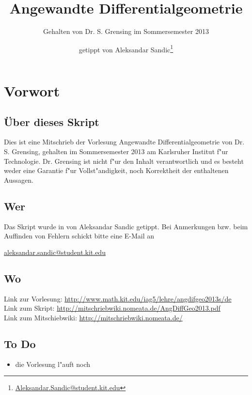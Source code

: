 \documentclass[paper=A4, twoside, chapterprefix=true, bibliography=totoc, headsepline]{scrbook}
\title{Angewandte Differentialgeometrie}
\subtitle{Gehalten von Dr. S. Grensing im Sommersemester 2013}
\author{getippt von Aleksandar Sandic\thanks{\href{mailto:aleksandar.sandic@student.kit.edu}{Aleksandar.Sandic@student.kit.edu}}}
\theoremstyle{break}
\theoremstyle{nonumberbreak}
\theoremstyle{emptybreak}
\theoremstyle{break}
\newcommand{\quot}[1]{\textrm{\glqq}{#1}\textrm{\grqq}}
\begin{document}
\maketitle

\setlength\parskip{0.6pt}
\tableofcontents

\chapter*{Vorwort}

\section*{\"Uber dieses Skript}
Dies ist eine Mitschrieb der Vorlesung \quot{Angewandte Differentialgeometrie} von Dr. S. Grensing, gehalten im Sommersemester 2013 am Karlsruher Institut f"ur Technologie.
Dr. Grensing ist nicht f"ur den Inhalt verantwortlich und es besteht weder eine Garantie f"ur Vollst"andigkeit, noch Korrektheit der enthaltenen Aussagen.

\section*{Wer}
Das Skript wurde in von Aleksandar Sandic getippt.
Bei Anmerkungen bzw. beim Auffinden von Fehlern schickt bitte eine E-Mail an
\begin{center}
  \href{mailto:aleksandar.sandic@student.kit.edu}{aleksandar.sandic@student.kit.edu}
\end{center}

\section*{Wo}
Link zur Vorlesung: \url{http://www.math.kit.edu/iag5/lehre/angdifgeo2013s/de}\\
Link zum Skript: \url{http://mitschriebwiki.nomeata.de/AngDiffGeo2013.pdf}\\
Link zum Mitschiebwiki: \url{http://mitschriebwiki.nomeata.de/}

\section*{To Do}\begin{itemize}
\item die Vorlesung l"auft noch
\end{itemize}
\end{document}
